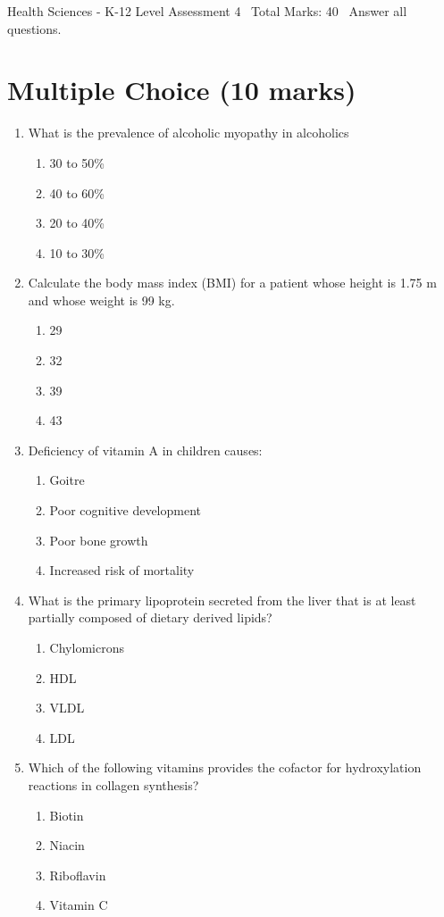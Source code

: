 \documentclass[12pt]{article}
\begin{document}
\begin{center}
Health Sciences - K-12 Level Assessment 4 \
Total Marks: 40 \
Answer all questions.
\end{center}

\section*{Multiple Choice (10 marks)}
\begin{enumerate}[label=\arabic*.]
\item What is the prevalence of alcoholic myopathy in alcoholics
\begin{enumerate}[label=(\alph*)]
    \item 30 to 50\%
    \item 40 to 60\%
    \item 20 to 40\%
    \item 10 to 30\%
\end{enumerate}
\item Calculate the body mass index (BMI) for a patient whose height is 1.75 m and whose weight is 99 kg.
\begin{enumerate}[label=(\alph*)]
    \item 29
    \item 32
    \item 39
    \item 43
\end{enumerate}
\item Deficiency of vitamin A in children causes:
\begin{enumerate}[label=(\alph*)]
    \item Goitre
    \item Poor cognitive development
    \item Poor bone growth
    \item Increased risk of mortality
\end{enumerate}
\item What is the primary lipoprotein secreted from the liver that is at least partially composed of dietary derived lipids?
\begin{enumerate}[label=(\alph*)]
    \item Chylomicrons
    \item HDL
    \item VLDL
    \item LDL
\end{enumerate}
\item Which of the following vitamins provides the cofactor for hydroxylation reactions in collagen synthesis?
\begin{enumerate}[label=(\alph*)]
    \item Biotin
    \item Niacin
    \item Riboflavin
    \item Vitamin C
\end{enumerate}
\end{enumerate}
\end{document}
